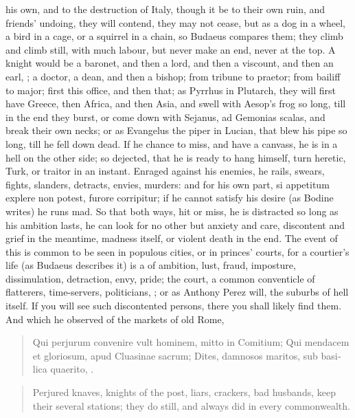 {his own, and to the destruction of Italy, though it be to their own
ruin, and friends' undoing, they will contend, they may not cease, but
as a dog in a wheel, a bird in a cage, or a squirrel in a chain, so
Budaeus compares them; they climb and climb still, with
much labour, but never make an end, never at the top. A knight would be
a baronet, and then a lord, and then a viscount, and then an earl, \etc{};
a doctor, a dean, and then a bishop; from tribune to praetor; from
bailiff to major; first this office, and then that; as Pyrrhus in
Plutarch, they will first have Greece, then Africa, and then
Asia, and swell with Aesop's frog so long, till in the end they burst,
or come down with Sejanus, ad Gemonias scalas, and break their own
necks; or as Evangelus the piper in Lucian, that blew his pipe so long,
till he fell down dead. If he chance to miss, and have a canvass, he is
in a hell on the other side; so dejected, that he is ready to hang
himself, turn heretic, Turk, or traitor in an instant. Enraged against
his enemies, he rails, swears, fights, slanders, detracts, envies,
murders: and for his own part, si appetitum explere non potest, furore
corripitur; if he cannot satisfy his desire (as Bodine writes) he
runs mad. So that both ways, hit or miss, he is distracted so long as
his ambition lasts, he can look for no other but anxiety and care,
discontent and grief in the meantime, madness itself, or violent
death in the end. The event of this is common to be seen in populous
cities, or in princes' courts, for a courtier's life (as Budaeus
describes it) is a  of ambition, lust, fraud,
imposture, dissimulation, detraction, envy, pride; the court, a
common conventicle of flatterers, time-servers, politicians, \etc{}; or as
 Anthony Perez will, the suburbs of hell itself. If you will see
such discontented persons, there you shall likely find them. And
which he observed of the markets of old Rome,
%
\begin{latin}
\begin{quote}
Qui perjurum convenire vult hominem, mitto in Comitium;
Qui mendacem et gloriosum, apud Cluasinae sacrum;
Dites, damnosos maritos, sub basilica quaerito, \etc{}.
\end{quote}
\end{latin}
\translationrule
\begin{quote}
Perjured knaves, knights of the post, liars, crackers, bad husbands,
\etc{} keep their several stations; they do still, and always did in every
commonwealth.
\end{quote}

}
